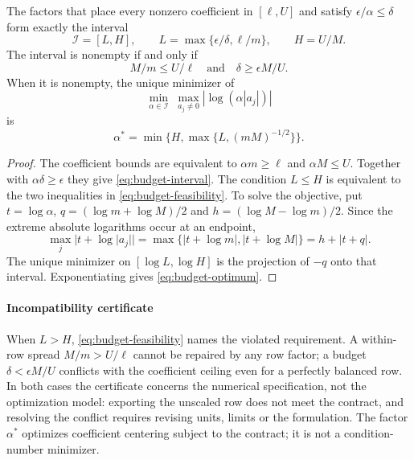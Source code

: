 \begin{proposition}
\label{prop:budget}
The factors that place every nonzero coefficient in $[\ell,U]$ and satisfy
$\epsilon/\alpha\le\delta$ form exactly the interval
\begin{equation}\label{eq:budget-interval}
 \mathcal I=[L,H],\qquad
 L=\max\{\epsilon/\delta,\ell/m\},\qquad H=U/M.
\end{equation}
The interval is nonempty if and only if
\begin{equation}\label{eq:budget-feasibility}
 M/m\le U/\ell\quad\text{and}\quad \delta\ge\epsilon M/U.
\end{equation}
When it is nonempty, the unique minimizer of
\begin{equation}\label{eq:budget-objective}
 \min_{\alpha\in\mathcal I}\;\max_{a_j\ne0}|\log(\alpha|a_j|)|
\end{equation}
is
\begin{equation}\label{eq:budget-optimum}
 \alpha^*=\min\{H,\max\{L,(mM)^{-1/2}\}\}.
\end{equation}
\end{proposition}

\begin{proof}
The coefficient bounds are equivalent to $\alpha m\ge\ell$ and $\alpha M\le U$.
Together with $\alpha\delta\ge\epsilon$ they give \eqref{eq:budget-interval}.
The condition $L\le H$ is equivalent to the two inequalities in
\eqref{eq:budget-feasibility}. To solve the objective, put $t=\log\alpha$,
$q=(\log m+\log M)/2$ and $h=(\log M-\log m)/2$. Since the extreme absolute
logarithms occur at an endpoint,
\[
 \max_j|t+\log|a_j||=\max\{|t+\log m|,|t+\log M|\}=h+|t+q|.
\]
The unique minimizer on $[\log L,\log H]$ is the projection of $-q$ onto that
interval. Exponentiating gives \eqref{eq:budget-optimum}.
\end{proof}

\paragraph{Incompatibility certificate}
When $L>H$, \eqref{eq:budget-feasibility} names the violated requirement. A within-row
spread $M/m>U/\ell$ cannot be repaired by any row factor; a budget $\delta<\epsilon M/U$
conflicts with the coefficient ceiling even for a perfectly balanced row. In both cases the
certificate concerns the numerical specification, not the optimization model: exporting the
unscaled row does not meet the contract, and resolving the conflict requires revising units,
limits or the formulation. The factor $\alpha^*$ optimizes coefficient centering subject to
the contract; it is not a condition-number minimizer.

